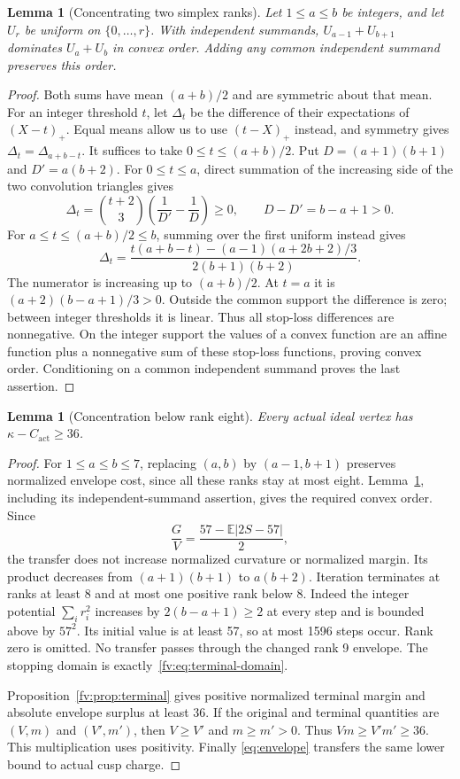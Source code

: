 \documentclass[11pt]{article}
\newtheorem{lemma}[theorem]{Lemma}
\theoremstyle{remark}\newtheorem{remark}[theorem]{Remark}
\numberwithin{equation}{section}
\begin{document}
\begin{lemma}[Concentrating two simplex ranks]\label{fv:lem:concentration}
Let $1\le a\le b$ be integers, and let $U_r$ be uniform on
 $\{0,\ldots,r\}$. With independent summands,
$U_{a-1}+U_{b+1}$ dominates $U_a+U_b$ in convex order.
Adding any common independent summand preserves this order.
\end{lemma}
\begin{proof}
Both sums have mean $(a+b)/2$ and are symmetric about that mean.
For an integer threshold $t$, let $\Delta_t$ be the difference
of their expectations of $(X-t)_+$. Equal means allow us to use
 $(t-X)_+$ instead, and symmetry gives
 $\Delta_t=\Delta_{a+b-t}$. It suffices to take
 $0\le t\le(a+b)/2$. Put $D=(a+1)(b+1)$ and $D'=a(b+2)$.
For $0\le t\le a$, direct summation of the increasing side of
the two convolution triangles gives
 \[
 \Delta_t=\binom{t+2}{3}\left(\frac1{D'}-\frac1D\right)\ge0,
 \qquad D-D'=b-a+1>0.
\]
For $a\le t\le(a+b)/2\le b$, summing over the first uniform
instead gives
 \[
 \Delta_t=
 \frac{t(a+b-t)-(a-1)(a+2b+2)/3}{2(b+1)(b+2)}.
\]
The numerator is increasing up to $(a+b)/2$. At $t=a$ it is
 $(a+2)(b-a+1)/3>0$. Outside the common support the difference
is zero; between integer thresholds it is linear. Thus all
stop-loss differences are nonnegative. On the integer support the
values of a convex function are an affine function plus a
nonnegative sum of these stop-loss functions, proving convex order. Conditioning
on a common independent summand proves the last assertion.
\end{proof}

\begin{lemma}[Concentration below rank eight]\label{prop:surplus}Every actual ideal vertex has $\kappa-C_{\mathrm{act}}\ge36$.
\end{lemma}
\begin{proof}
For $1\le a\le b\le7$, replacing $(a,b)$ by $(a-1,b+1)$ preserves
normalized envelope cost, since all these ranks stay at most eight.
Lemma~\ref{fv:lem:concentration}, including its independent-summand
assertion, gives the required convex order. Since
 \[
 \frac GV=\frac{57-\mathbb E|2S-57|}{2},
\]
the transfer does not increase normalized curvature or normalized
margin. Its product decreases from $(a+1)(b+1)$ to $a(b+2)$. Iteration
terminates at ranks at least 8 and at most one positive rank below 8.
Indeed the integer potential $\sum_i r_i^2$ increases by
 $2(b-a+1)\ge2$ at every step and is bounded above by $57^2$.
Its initial value is at least 57, so at most 1596 steps occur.
Rank zero is omitted. No transfer passes through the changed rank 9
envelope. The stopping domain is exactly~\eqref{fv:eq:terminal-domain}.

Proposition~\ref{fv:prop:terminal} gives positive normalized terminal
margin and absolute envelope surplus at least 36. If the original and terminal quantities
are $(V,m)$ and $(V',m')$, then $V\ge V'$ and $m\ge m'>0$. Thus
 $Vm\ge V'm'\ge36$. This multiplication uses positivity. Finally
\eqref{eq:envelope} transfers the same lower bound to actual cusp charge.
\end{proof}
\end{document}
